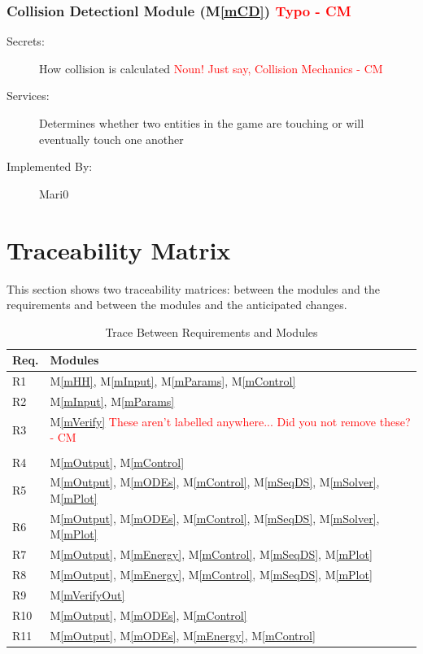\documentclass[12pt, titlepage]{article}
\newcommand{\mref}[1]{M\ref{#1}}
\begin{document}
\subsubsection{Collision Detectionl Module (\mref{mCD}) \textcolor{red}{Typo - CM} \\}
\begin{description}
\item[Secrets:]How collision is calculated \textcolor{red}{Noun! Just say, Collision Mechanics - CM} \\
\item[Services:]Determines whether two entities in the game are touching or will eventually touch one another
\item[Implemented By:] Mari0
\end{description}

\section{Traceability Matrix} \label{SecTM}

This section shows two traceability matrices: between the modules and the
requirements and between the modules and the anticipated changes.

\begin{table}[H]
\centering
\begin{tabular}{p{} p{}}
\toprule
\textbf{Req.} & \textbf{Modules}\\
\midrule
R1 & \mref{mHH}, \mref{mInput}, \mref{mParams}, \mref{mControl}\\
R2 & \mref{mInput}, \mref{mParams}\\
R3 & \mref{mVerify} \textcolor{red}{These aren't labelled anywhere... Did you not remove these? - CM} \\\\
R4 & \mref{mOutput}, \mref{mControl}\\
R5 & \mref{mOutput}, \mref{mODEs}, \mref{mControl}, \mref{mSeqDS}, \mref{mSolver}, \mref{mPlot}\\
R6 & \mref{mOutput}, \mref{mODEs}, \mref{mControl}, \mref{mSeqDS}, \mref{mSolver}, \mref{mPlot}\\
R7 & \mref{mOutput}, \mref{mEnergy}, \mref{mControl}, \mref{mSeqDS}, \mref{mPlot}\\
R8 & \mref{mOutput}, \mref{mEnergy}, \mref{mControl}, \mref{mSeqDS}, \mref{mPlot}\\
R9 & \mref{mVerifyOut}\\
R10 & \mref{mOutput}, \mref{mODEs}, \mref{mControl}\\
R11 & \mref{mOutput}, \mref{mODEs}, \mref{mEnergy}, \mref{mControl}\\
\bottomrule
\end{tabular}
\caption{Trace Between Requirements and Modules}
\label{TblRT}
\end{table}
\end{document}
